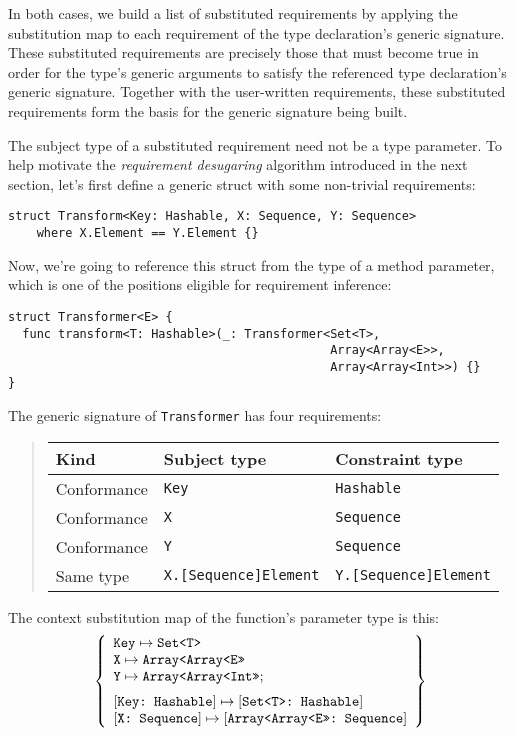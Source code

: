 \documentclass[../generics]{subfiles}
\begin{document}
%
In both cases, we build a list of substituted requirements by applying the substitution map to each requirement of the type declaration's generic signature. These substituted requirements are precisely those that must become true in order for the type's generic arguments to satisfy the referenced type declaration's generic signature. Together with the user-written requirements, these substituted requirements form the basis for the generic signature being built. 
\begin{example}
The subject type of a substituted requirement need not be a type parameter. To help motivate the \emph{requirement desugaring} algorithm introduced in the next section, let's first define a generic struct with some non-trivial requirements:
\begin{Verbatim}
struct Transform<Key: Hashable, X: Sequence, Y: Sequence>
    where X.Element == Y.Element {}
\end{Verbatim}
Now, we're going to reference this struct from the type of a method parameter, which is one of the positions eligible for requirement inference:
\begin{Verbatim}
struct Transformer<E> {
  func transform<T: Hashable>(_: Transformer<Set<T>,
                                             Array<Array<E>>,
                                             Array<Array<Int>>) {}
}
\end{Verbatim}
The generic signature of \texttt{Transformer} has four requirements:
\begin{quote}
\begin{tabular}{lll}
\toprule
\textbf{Kind}&\textbf{Subject type}&\textbf{Constraint type}\\
\midrule
Conformance&\texttt{Key}&\texttt{Hashable}\\
Conformance&\texttt{X}&\texttt{Sequence}\\
Conformance&\texttt{Y}&\texttt{Sequence}\\
Same type&\texttt{X.[Sequence]Element}&\texttt{Y.[Sequence]Element}\\
\bottomrule
\end{tabular}
\end{quote}
The context substitution map of the function's parameter type is this:
\[
\SubstMapLongC{\SubstType{Key}{Set<T>}\\
\SubstType{X}{Array<Array<E>>}\\
\SubstType{Y}{Array<Array<Int>>}}{
\SubstConf{Key}{Set<T>}{Hashable}\\
\SubstConf{X}{Array<Array<E>>}{Sequence}\\
}\]
\end{example}
\end{document}
